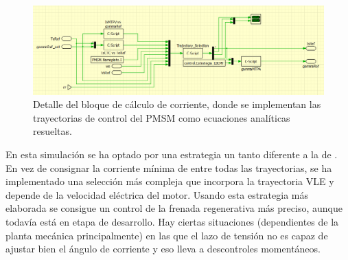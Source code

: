 \begin{figure}[H]
	\centering
	\includegraphics[width=0.7\linewidth]{fig/PLECS_currentref1}
	\caption{Detalle del bloque de cálculo de corriente, donde se implementan las trayectorias de control del PMSM como ecuaciones analíticas resueltas.}
\end{figure}

En esta simulación se ha optado por una estrategia un tanto diferente a la de \cite{carlos2023}. En vez de consignar la corriente mínima de entre todas las trayectorias, se ha implementado una selección más compleja que incorpora la trayectoria VLE y depende de la velocidad eléctrica del motor. Usando esta estrategia más elaborada se consigue un control de la frenada regenerativa más preciso, aunque todavía está en etapa de desarrollo. Hay ciertas situaciones (dependientes de la planta mecánica principalmente) en las que el lazo de tensión no es capaz de ajustar bien el ángulo de corriente y eso lleva a descontroles momentáneos.


